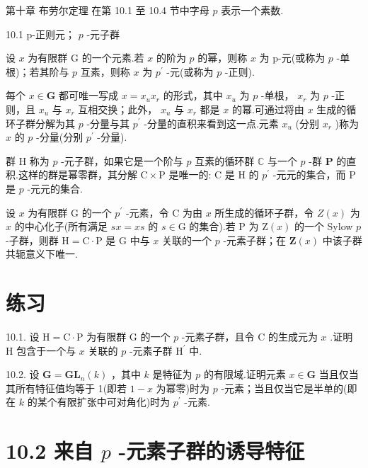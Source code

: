 \documentclass[10pt]{article}
\begin{document}
第十章 布劳尔定理 在第 10.1 至 10.4 节中字母 \(p\) 表示一个素数.

10.1 p-正则元； \(p\) -元子群

设 \(x\) 为有限群 G 的一个元素.若 \(x\) 的阶为 \(p\) 的幂，则称 \(x\) 为 p-元(或称为 \(p\) -单根)；若其阶与 \(p\) 互素，则称 \(x\) 为 \({p}^{\prime }\) -元(或称为 \(p\) -正则).

每个 \(x \in  \mathbf{G}\) 都可唯一写成 \(x = {x}_{u}{x}_{r}\) 的形式，其中 \({x}_{u}\) 为 \(p\) -单根， \({x}_{r}\) 为 \(p\) -正则，且 \({x}_{u}\) 与 \({x}_{r}\) 互相交换；此外， \({x}_{u}\) 与 \({x}_{r}\) 都是 \(x\) 的幂.可通过将由 \(x\) 生成的循环子群分解为其 \(p\) -分量与其 \({p}^{\prime }\) -分量的直积来看到这一点.元素 \({x}_{u}\) (分别 \({x}_{r}\) )称为 \(x\) 的 \(p\) -分量(分别 \({p}^{\prime }\) -分量).

群 \(\mathrm{H}\) 称为 \(p\) -元子群，如果它是一个阶与 \(p\) 互素的循环群 \(\mathbb{C}\) 与一个 \(p\) -群 \(\mathbf{P}\) 的直积.这样的群是幂零群，其分解 \(\mathrm{C} \times  \mathrm{P}\) 是唯一的: \(\mathrm{C}\) 是 \(\mathrm{H}\) 的 \({p}^{\prime }\) -元元的集合，而 \(\mathrm{P}\) 是 \(p\) -元元的集合.

设 \(x\) 为有限群 \(\mathrm{G}\) 的一个 \({p}^{\prime }\) -元素，令 \(\mathrm{C}\) 为由 \(x\) 所生成的循环子群，令 \(Z\left( x\right)\) 为 \(x\) 的中心化子(所有满足 \({sx} = {xs}\) 的 \(s \in  \mathrm{G}\) 的集合).若 \(\mathrm{P}\) 为 \(\mathrm{Z}\left( x\right)\) 的一个 Sylow \(p\) -子群，则群 \(\mathrm{H} = \mathrm{C} \cdot  \mathrm{P}\) 是 \(\mathrm{G}\) 中与 \(x\) 关联的一个 \(p\) -元素子群；在 \(\mathbf{Z}\left( x\right)\) 中该子群共轭意义下唯一.

\section*{练习}

10.1. 设 \(\mathrm{H} = \mathrm{C} \cdot  \mathrm{P}\) 为有限群 \(\mathrm{G}\) 的一个 \(p\) -元素子群，且令 C 的生成元为 \(x\) .证明 \(\mathrm{H}\) 包含于一个与 \(x\) 关联的 \(p\) -元素子群 \({\mathrm{H}}^{\prime }\) 中.

10.2. 设 \(\mathbf{G} = {\mathbf{{GL}}}_{n}\left( k\right)\) ，其中 \(k\) 是特征为 \(p\) 的有限域.证明元素 \(x \in  \mathbf{G}\) 当且仅当其所有特征值均等于 1(即若 \(1 - x\) 为幂零)时为 \(p\) -元素；当且仅当它是半单的(即在 \(k\) 的某个有限扩张中可对角化)时为 \({p}^{\prime }\) -元素.

\section*{10.2 来自 \(p\) -元素子群的诱导特征}
\end{document}
